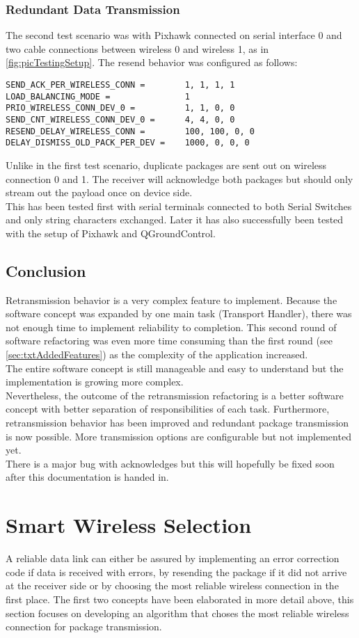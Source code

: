 \subsubsection{Redundant Data Transmission}
The second test scenario was with Pixhawk connected on serial interface 0 and two cable connections between wireless 0 and wireless 1, as in \autoref{fig:picTestingSetup}. The resend behavior was configured as follows:
\begin{lstlisting}
SEND_ACK_PER_WIRELESS_CONN =		1, 1, 1, 1
LOAD_BALANCING_MODE =				1
PRIO_WIRELESS_CONN_DEV_0 =			1, 1, 0, 0
SEND_CNT_WIRELESS_CONN_DEV_0 =		4, 4, 0, 0
RESEND_DELAY_WIRELESS_CONN =		100, 100, 0, 0
DELAY_DISMISS_OLD_PACK_PER_DEV =	1000, 0, 0, 0
\end{lstlisting}
Unlike in the first test scenario, duplicate packages are sent out on wireless connection 0 and 1. The receiver will acknowledge both packages but should only stream out the payload once on device side.\\
This has been tested first with serial terminals connected to both Serial Switches and only string characters exchanged. Later it has also successfully been tested with the setup of Pixhawk and QGroundControl.
%
\subsection{Conclusion}
Retransmission behavior is a very complex feature to implement. Because the software concept was expanded by one main task (Transport Handler), there was not enough time to implement reliability to completion. This second round of software refactoring was even more time consuming than the first round (see \autoref{sec:txtAddedFeatures}) as the complexity of the application increased.\\
The entire software concept is still manageable and easy to understand but the implementation is growing more complex.\\
Nevertheless, the outcome of the retransmission refactoring is a better software concept with better separation of responsibilities of each task. Furthermore, retransmission behavior has been improved and redundant package transmission is now possible. More transmission options are configurable but not implemented yet.\\
There is a major bug with acknowledges but this will hopefully be fixed soon after this documentation is handed in.
%
%
%
%
%
\section{Smart Wireless Selection} \label{sec:txtSmartWirelessSelection}
A reliable data link can either be assured by implementing an error correction code if data is received with errors, by resending the package if it did not arrive at the receiver side or by choosing the most reliable wireless connection in the first place. The first two concepts have been elaborated in more detail above, this section focuses on developing an algorithm that choses the most reliable wireless connection for package transmission.
%
%
